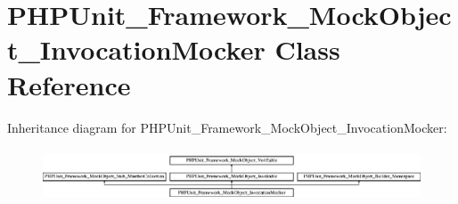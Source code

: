 \hypertarget{class_p_h_p_unit___framework___mock_object___invocation_mocker}{}\section{P\+H\+P\+Unit\+\_\+\+Framework\+\_\+\+Mock\+Object\+\_\+\+Invocation\+Mocker Class Reference}
\label{class_p_h_p_unit___framework___mock_object___invocation_mocker}
Inheritance diagram for P\+H\+P\+Unit\+\_\+\+Framework\+\_\+\+Mock\+Object\+\_\+\+Invocation\+Mocker\+:\begin{figure}[H]
\begin{center}
\leavevmode
\includegraphics[height=1.586402cm]{class_p_h_p_unit___framework___mock_object___invocation_mocker}
\end{center}
\end{figure}
